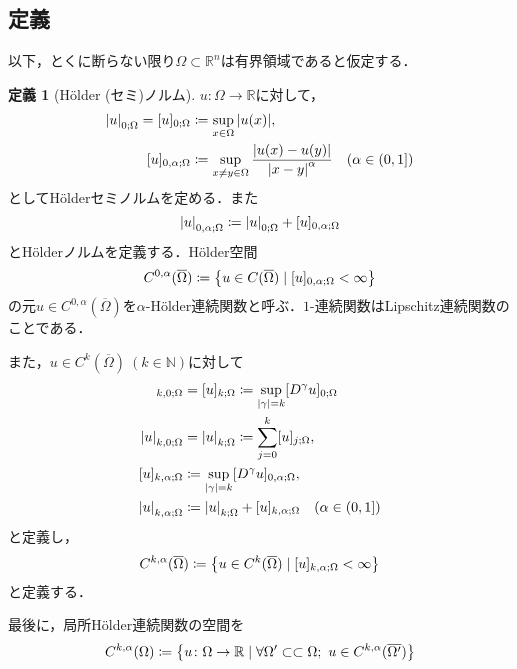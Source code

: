 \documentclass[a4paper]{ltjsarticle}
\newcommand{\Rset}{\mathbb{R}}
\newcommand{\Nset}{\mathbb{N}}
\newcommand{\Om}{\Omega}
\newcommand{\Ombar}{\overline{\Omega}}
\newcommand{\ssubset}{\subset\subset}
\newcommand{\1}{\mathbbm{1}}
\numberwithin{equation}{section}
\theoremstyle{definition}
\newtheorem{dfn}[thm]{定義}
\begin{document}
\subsection{定義}
以下，とくに断らない限り$\Omega\subset \Rset^n$は有界領域であると仮定する．
\begin{dfn}[Hölder (セミ)ノルム]
    $u\colon \Om\to \Rset$に対して，
    \begin{align}
        \abs{u}_{0;\Omega}=[u]_{0;\Om}&\coloneqq \sup_{x\in\Om}\abs{u(x)},\\
        [u]_{0,\alpha;\Om}&\coloneqq \sup_{x\neq y\in\Om}\frac{\abs{u(x)-u(y)}}{\abs{x-y}^\alpha} \quad (\alpha\in(0,1])
    \end{align}
    としてHölderセミノルムを定める．また
    \begin{equation}
        \abs{u}_{0,\alpha;\Om}\coloneqq \abs{u}_{0;\Om}+[u]_{0,\alpha;\Om}
    \end{equation}
    とHölderノルムを定義する．Hölder空間
    \begin{equation}
        C^{0,\alpha}(\Ombar)\coloneqq \qty{u\in C(\Ombar)\mid [u]_{0,\alpha;\Om}<\infty} 
    \end{equation}
    の元$u\in C^{0,\alpha}(\Ombar)$を$\alpha$-Hölder連続関数と呼ぶ．$1$-連続関数はLipschitz連続関数のことである．

    また，$u\in C^k(\Ombar)\ (k\in\Nset)$に対して
    \begin{align}
        [u]_{k,0;\Om}&=[u]_{k;\Om}\coloneqq \sup_{\abs{\gamma}=k}[D^\gamma u]_{0;\Om}\\
        \abs{u}_{k,0;\Om}&=\abs{u}_{k;\Om}\coloneqq \sum_{j=0}^k [u]_{j;\Om},\\
        [u]_{k,\alpha;\Om}&\coloneqq \sup_{\abs{\gamma}=k}[D^\gamma u]_{0,\alpha;\Om},\\
        \abs{u}_{k,\alpha;\Om}&\coloneqq \abs{u}_{k;\Om}+[u]_{k,\alpha;\Om}\quad (\alpha\in(0,1])
    \end{align}
    と定義し，
    \begin{equation}
        C^{k,\alpha}(\Ombar)\coloneqq\qty{u\in C^k(\Ombar)\mid [u]_{k,\alpha;\Om}<\infty}
    \end{equation}
    と定義する．

    最後に，局所Hölder連続関数の空間を
    \begin{equation}
        C^{k,\alpha}(\Om)\coloneqq \qty{u\colon \Om\to\Rset\mid \forall \Om'\ssubset \Om;\ u\in C^{k,\alpha}(\overline{\Om'})}
    \end{equation}
\end{dfn}
\end{document}
